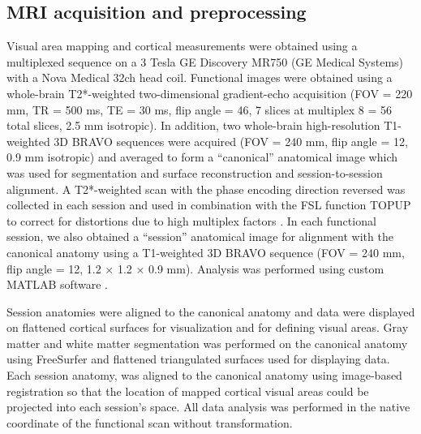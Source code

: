 \documentclass{report}
\begin{document}
\noindent
\subsection{MRI acquisition and preprocessing}

Visual area mapping and cortical measurements were obtained using a multiplexed sequence on a 3 Tesla GE Discovery MR750 (GE Medical Systems) with a Nova Medical 32ch head coil. Functional images were obtained using a whole-brain T2*-weighted two-dimensional gradient-echo acquisition (FOV = 220 mm, TR = 500 ms, TE = 30 ms, flip angle = 46\degree, 7 slices at multiplex 8 = 56 total slices, 2.5 mm isotropic). In addition, two whole-brain high-resolution T1-weighted 3D BRAVO sequences were acquired (FOV = 240 mm, flip angle = 12\degree, 0.9 mm isotropic) and averaged to form a “canonical” anatomical image which was used for segmentation and surface reconstruction and session-to-session alignment. A T2*-weighted scan with the phase encoding direction reversed was collected in each session and used in combination with the FSL function TOPUP to correct for distortions due to high multiplex factors \citep{Andersson2003-yb}. In each functional session, we also obtained a “session” anatomical image for alignment with the canonical anatomy using a T1-weighted 3D BRAVO sequence (FOV = 240 mm, flip angle = 12\degree, 1.2 $\times$ 1.2 $\times$ 0.9 mm). Analysis was performed using custom MATLAB software \citep{Gardner2018-hf}.

Session anatomies were aligned to the canonical anatomy and data were displayed on flattened cortical surfaces for visualization and for defining visual areas. Gray matter and white matter segmentation was performed on the canonical anatomy using FreeSurfer \citep{Dale1999-oq} and flattened triangulated surfaces used for displaying data. Each session anatomy, was aligned to the canonical anatomy using image-based registration \citep{Nestares2000-by} so that the location of mapped cortical visual areas could be projected into each session’s space. All data analysis was performed in the native coordinate of the functional scan without transformation.
\end{document}
